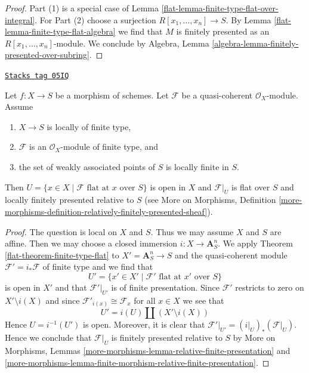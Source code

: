 \begin{proof}

Part (1) is a special case of
Lemma \ref{flat-lemma-finite-type-flat-over-integral}.
For Part (2) choose a surjection $R[x_1, \ldots, x_n] \to S$.
By Lemma \ref{flat-lemma-finite-type-flat-algebra} we find that $M$
is finitely presented as an $R[x_1, \ldots, x_n]$-module.
We conclude by Algebra, Lemma
\ref{algebra-lemma-finitely-presented-over-subring}.
\end{proof}

\begin{lemma}

\label{flat-lemma-finite-type-flat}
\href{https://stacks.math.columbia.edu/tag/05IQ}{\texttt{Stacks tag 05IQ}}

Let $f : X \to S$ be a morphism of schemes.
Let $\mathcal{F}$ be a quasi-coherent $\mathcal{O}_X$-module.
Assume
\begin{enumerate}
\item $X \to S$ is locally of finite type,
\item $\mathcal{F}$ is an $\mathcal{O}_X$-module of finite type, and
\item the set of weakly associated points of $S$ is locally finite in $S$.
\end{enumerate}
Then $U = \{x \in X \mid \mathcal{F}\text{ flat at }x\text{ over }S\}$
is open in $X$ and $\mathcal{F}|_U$ is flat over $S$ and locally
finitely presented relative to $S$ (see
More on Morphisms, Definition
\ref{more-morphisms-definition-relatively-finitely-presented-sheaf}).
\end{lemma}

\begin{proof}

The question is local on $X$ and $S$. Thus we may assume $X$ and $S$ are affine.
Then we may choose a closed immersion $i : X \to \mathbf{A}^n_S$.
We apply Theorem \ref{flat-theorem-finite-type-flat} to $X' = \mathbf{A}^n_S \to S$
and the quasi-coherent module $\mathcal{F}' = i_*\mathcal{F}$ of finite type
and we find that
$$
U' = \{x' \in X' \mid \mathcal{F}'\text{ flat at }x'\text{ over }S\}
$$
is open in $X'$ and that $\mathcal{F}'|_{U'}$ is of finite presentation.
Since $\mathcal{F}'$ restricts to zero on $X' \setminus i(X)$ and
since $\mathcal{F}'_{i(x)} \cong \mathcal{F}_x$ for all $x \in X$ we see that
$$
U' = i(U) \amalg (X' \setminus i(X))
$$
Hence $U = i^{-1}(U')$ is open. Moreover, it is clear that
$\mathcal{F}'|_{U'} = (i|_U)_*(\mathcal{F}|_U)$.
Hence we conclude that $\mathcal{F}|_U$ is finitely presented
relative to $S$ by More on Morphisms, Lemmas
\ref{more-morphisms-lemma-relative-finite-presentation} and
\ref{more-morphisms-lemma-finite-morphism-relative-finite-presentation}.
\end{proof}


